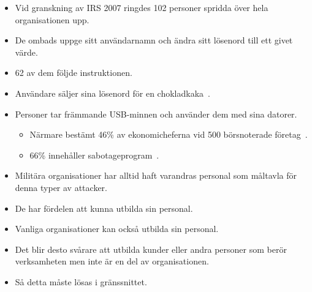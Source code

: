 \documentclass{beamer}
\begin{document}
\begin{frame}{\insertsubsectionhead}
  \begin{itemize}
    \item Vid granskning av IRS 2007 ringdes 102 personer spridda över hela 
      organisationen upp.

    \item De ombads uppge sitt användarnamn och ändra sitt lösenord till ett 
      givet värde.

    \item 62 av dem följde instruktionen.

  \end{itemize}
\end{frame}

\begin{frame}{\insertsubsectionhead}
  \begin{itemize}
    \item Användare säljer sina lösenord för en 
      chokladkaka~\cite{dn2010choklad}.

    \item Personer tar främmande USB-minnen och använder dem med sina datorer.
      \begin{itemize}
        \item Närmare bestämt \unit{46}{\%} av ekonomicheferna vid 500 
          börsnoterade företag~\cite{pickupusb}.
        \item \unit{66}{\%} innehåller sabotageprogram~\cite{Sophos2011usbmal}.
      \end{itemize}

  \end{itemize}
\end{frame}

\begin{frame}{\insertsubsectionhead}
  \begin{itemize}
    \item Militära organisationer har alltid haft varandras personal som 
      måltavla för denna typer av attacker.

    \item De har fördelen att kunna utbilda sin personal.

    \item Vanliga organisationer kan också utbilda sin personal.

    \item Det blir desto svårare att utbilda kunder eller andra personer som 
      berör verksamheten men inte är en del av organisationen.

    \item Så detta måste lösas i gränssnittet.

  \end{itemize}
\end{frame}
\end{document}
